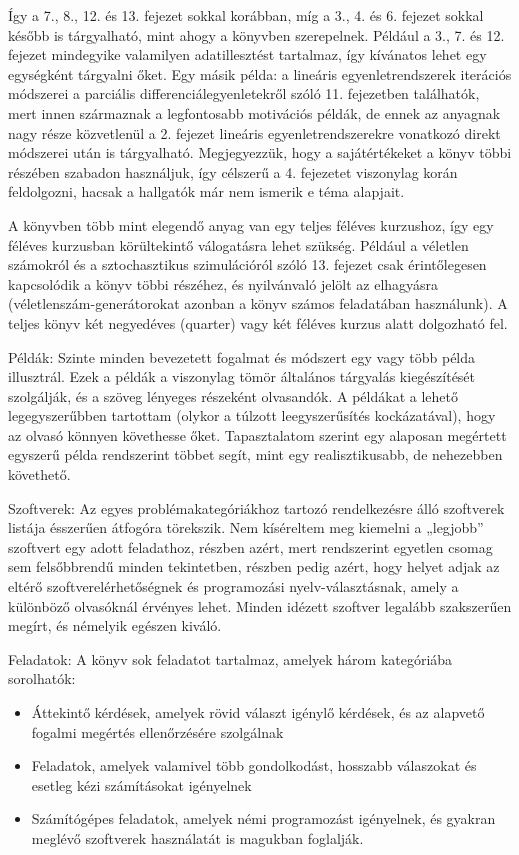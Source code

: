 \documentclass[
  magyar,
  11pt]{article}
\providecommand{\tightlist}{%
  \setlength{\itemsep}{0pt}\setlength{\parskip}{0pt}}
\begin{document}
Így a 7., 8., 12. és 13. fejezet sokkal korábban, míg a 3., 4. és 6.
fejezet sokkal később is tárgyalható, mint ahogy a könyvben szerepelnek.
Például a 3., 7. és 12. fejezet mindegyike valamilyen adatillesztést
tartalmaz, így kívánatos lehet egy egységként tárgyalni őket. Egy másik
példa: a lineáris egyenletrendszerek iterációs módszerei a parciális
differenciálegyenletekről szóló 11. fejezetben találhatók, mert innen
származnak a legfontosabb motivációs példák, de ennek az anyagnak nagy
része közvetlenül a 2. fejezet lineáris egyenletrendszerekre vonatkozó
direkt módszerei után is tárgyalható. Megjegyezzük, hogy a
sajátértékeket a könyv többi részében szabadon használjuk, így célszerű
a 4. fejezetet viszonylag korán feldolgozni, hacsak a hallgatók már nem
ismerik e téma alapjait.

A könyvben több mint elegendő anyag van egy teljes féléves kurzushoz,
így egy féléves kurzusban körültekintő válogatásra lehet szükség.
Például a véletlen számokról és a sztochasztikus szimulációról szóló 13.
fejezet csak érintőlegesen kapcsolódik a könyv többi részéhez, és
nyilvánvaló jelölt az elhagyásra (véletlenszám-generátorokat azonban a
könyv számos feladatában használunk). A teljes könyv két negyedéves
(quarter) vagy két féléves kurzus alatt dolgozható fel.

Példák: Szinte minden bevezetett fogalmat és módszert egy vagy több
példa illusztrál. Ezek a példák a viszonylag tömör általános tárgyalás
kiegészítését szolgálják, és a szöveg lényeges részeként olvasandók. A
példákat a lehető legegyszerűbben tartottam (olykor a túlzott
leegyszerűsítés kockázatával), hogy az olvasó könnyen követhesse őket.
Tapasztalatom szerint egy alaposan megértett egyszerű példa rendszerint
többet segít, mint egy realisztikusabb, de nehezebben követhető.

Szoftverek: Az egyes problémakategóriákhoz tartozó rendelkezésre álló
szoftverek listája ésszerűen átfogóra törekszik. Nem kíséreltem meg
kiemelni a „legjobb'' szoftvert egy adott feladathoz, részben azért,
mert rendszerint egyetlen csomag sem felsőbbrendű minden tekintetben,
részben pedig azért, hogy helyet adjak az eltérő szoftverelérhetőségnek
és programozási nyelv-választásnak, amely a különböző olvasóknál
érvényes lehet. Minden idézett szoftver legalább szakszerűen megírt, és
némelyik egészen kiváló.

Feladatok: A könyv sok feladatot tartalmaz, amelyek három kategóriába
sorolhatók:

\begin{itemize}
\tightlist
\item
  Áttekintő kérdések, amelyek rövid választ igénylő kérdések, és az
  alapvető fogalmi megértés ellenőrzésére szolgálnak
\item
  Feladatok, amelyek valamivel több gondolkodást, hosszabb válaszokat és
  esetleg kézi számításokat igényelnek
\item
  Számítógépes feladatok, amelyek némi programozást igényelnek, és
  gyakran meglévő szoftverek használatát is magukban foglalják.
\end{itemize}
\end{document}
